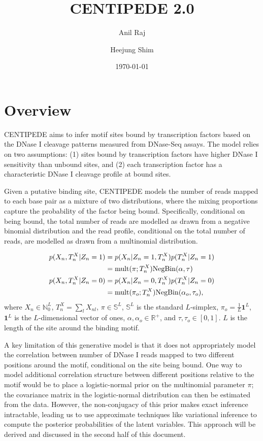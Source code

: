 \documentclass[reqno]{amsart}
\numberwithin{equation}{section}
\begin{document}
\title{CENTIPEDE 2.0}

\author{Anil Raj}
\author{Heejung Shim}

\date{\today}

\maketitle

\section{Overview}
CENTIPEDE aims to infer motif sites bound by transcription factors based on the DNase I cleavage patterns
measured from DNase-Seq assays. The model relies on two assumptions: (1) sites bound by transcription
factors have higher DNase I sensitivity than unbound sites, and (2) each transcription factor has a 
characteristic DNase I cleavage profile at bound sites.

Given a putative binding site, CENTIPEDE models the number of reads mapped to each base pair as a mixture
of two distributions, where the mixing proportions capture the probability of the factor being bound.
Specifically, conditional on being bound, the total number of reads are modelled as drawn from a 
negative binomial distribution and the read profile, conditional on the total number of reads, are 
modelled as drawn from a multinomial distribution.

\begin{align}
    p(X_n, T^X_n | Z_n=1) 
        & = p(X_n | Z_n=1, T^X_n) p(T^X_n | Z_n=1) \\
        & = \mathrm{mult}(\pi; T^X_n) \mathrm{NegBin}(\alpha, \tau) \\
    p(X_n, T^X_n | Z_n=0)
        & = p(X_n | Z_n=0, T^X_n) p(T^X_n | Z_n=0) \\
        & = \mathrm{mult}(\pi_o; T^X_n) \mathrm{NegBin}(\alpha_o, \tau_o),
\end{align}
where $X_n \in \mathbb{N}_0^L$, $T^X_n = \sum_l X_{nl}$, $\pi \in \mathbb{S}^L$, $\mathbb{S}^L$ is the standard $L$-simplex, $\pi_o = \frac{1}{L}\mathbf{1}^L$, $\mathbf{1}^L$ is the $L$-dimensional vector of ones, $\alpha, \alpha_o \in \mathbb{R}^+$, and $\tau, \tau_o \in [0,1]$. $L$ is the length of the site around the binding motif.

A key limitation of this generative model is that it does not appropriately model the correlation between number of 
DNase I reads mapped to two different positions around the motif, conditional on the site being bound. One way 
to model additional correlation structure between different positions relative to the motif would be to place 
a logistic-normal prior on the multinomial parameter $\pi$; the covariance matrix in the logistic-normal 
distribution can then be estimated from the data. However, the non-conjugacy of this prior makes exact 
inference intractable, leading us to use approximate techniques like variational inference to compute the 
posterior probabilities of the latent variables. This approach will be derived and discussed in the second 
half of this document.
\end{document}
